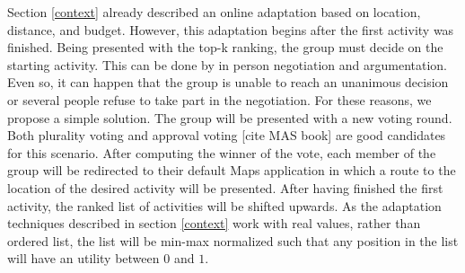 \documentclass[11pt,a4paper,oneside]{article}
\begin{document}
Section \ref{context} already described an online adaptation based on location, distance, and budget. However, this adaptation begins after the first activity was finished. Being presented with the top-k ranking, the group must decide on the starting activity. This can be done by in person negotiation and argumentation. Even so, it can happen that the group is unable to reach an unanimous decision or several people refuse to take part in the negotiation. For these reasons, we propose a simple solution. The group will be presented with a new voting round. Both plurality voting and approval voting [cite MAS book] are good candidates for this scenario. After computing the winner of the vote, each member of the group will be redirected to their default Maps application in which a route to the location of the desired activity will be presented. After having finished the first activity, the ranked list of activities will be shifted upwards. As the adaptation techniques described in section \ref{context} work with real values, rather than ordered list, the list will be min-max normalized such that any position in the list will have an utility between $0$ and $1$.
\end{document}
